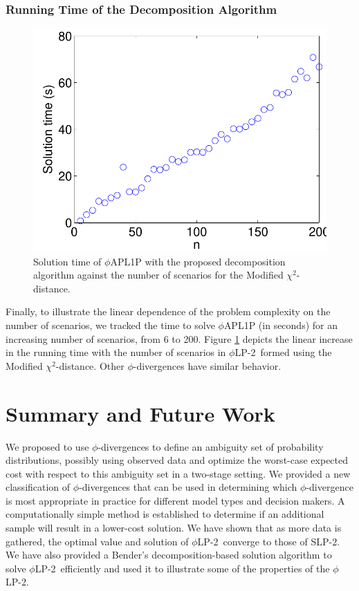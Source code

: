 \documentclass[opre,nonblindrev]{informs3} %
\newcommand{\plp}{$\phi$LP-2}
\begin{document}
\subsubsection{Running Time of the Decomposition Algorithm}
\label{ssec:run_time}

\begin{figure}[h]
	\FIGURE
	{%
		\includegraphics*[width=.40\textwidth]{images/runtime}
	}
	{
		Solution time of $\phi$APL1P with the proposed decomposition algorithm against the number of scenarios for the Modified $\chi^2$-distance.
		\label{fig:runtime}
	}
	{}
\end{figure}

Finally, to illustrate the linear dependence of the problem complexity on the number of scenarios, we tracked the time to solve $\phi$APL1P (in seconds) for an increasing number of scenarios, from 6 to 200. 
Figure \ref{fig:runtime} depicts the linear increase in the running time with the number of scenarios in \plp\ formed using the Modified $\chi^2$-distance. 
Other $\phi$-divergences have similar behavior. 

\section{Summary and Future Work}
\label{sec:plp_conclusions}

We proposed to use $\phi$-divergences
to define an ambiguity set of probability distributions, possibly using observed data and optimize the worst-case expected cost with respect to this ambiguity set in a two-stage setting.
We provided a new classification of $\phi$-divergences that can be used in determining which $\phi$-divergence is most appropriate in practice for different model types and decision makers.
A computationally simple method is established to determine if an additional sample %
will result in a lower-cost solution.
We have shown that as more data is gathered, the optimal value and solution of \plp\ converge to those of SLP-2. 
We have also provided a Bender's decomposition-based solution algorithm to solve \plp\ efficiently and used it to illustrate some of the properties of the \plp.
\end{document}
